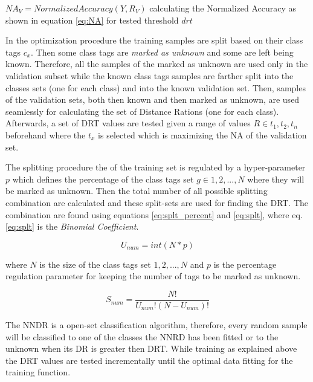 \documentclass[runningheads]{llncs}
\begin{document}
\begin{algorithm}[H]
{{    }

    $NA_{V} = NormalizedAccuracy(Y, R_{V})$ calculating the Normalized Accuracy as shown in equation \ref{eq:NA} for tested threshold $drt$\;


}

\end{algorithm}

In the optimization procedure the training samples are split based on their class tags $c_{x}$. Then some class tags are \textit{marked as unknown} and some are left being known. Therefore, all the samples of the marked as unknown are used only in the validation subset while the known class tags samples are farther split into the classes sets (one for each class) and into the known validation set. Then, samples of the validation sets, both then known and then marked as unknown, are used seamlessly for calculating the set of Distance Rations (one for each class). Afterwards, a set of DRT values are tested given a range of values $R \in {t_{1}, t_{2}, t_{n}}$ beforehand where the $t_{x}$ is selected which is maximizing the NA of the validation set.

The splitting procedure the of the training set is regulated by a hyper-parameter $p$ which defines the percentage of the class tags set $g \in {1,2,...,N}$ where they will be marked as unknown. Then the total number of all possible splitting combination are calculated and these split-sets are used for finding the DRT. The combination are found using equations \ref{eq:splt_percent} and \ref{eq:splt}, where eq.\ref{eq:splt} is the \textit{Binomial Coefficient}.

\begin{equation} \label{eq:splt_percent}
    U_{num} = int(N * p)
\end{equation}

\noindent
where $N$ is the size of the class tags set ${1,2,...,N}$ and $p$ is the percentage regulation parameter for keeping the number of tags to be marked as unknown.

\begin{equation} \label{eq:splt}
    S_{num} = \frac{N!}{U_{num}!(N-U_{num})!}
\end{equation}

The NNDR is a open-set classification algorithm, therefore, every random sample will be classified to one of the classes the NNRD has been fitted or to the unknown when its DR is greater then DRT. While training as explained above the DRT values are tested incrementally until the optimal data fitting for the training function.
\end{document}
